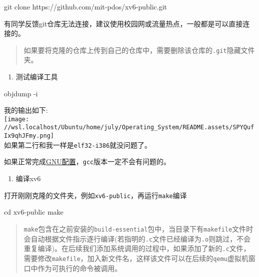 \documentclass[
]{article}
\newenvironment{Shaded}{}{}
\newcommand{\AttributeTok}[1]{\textcolor[rgb]{0.49,0.56,0.16}{#1}}
\newcommand{\BuiltInTok}[1]{\textcolor[rgb]{0.00,0.50,0.00}{#1}}
\newcommand{\ExtensionTok}[1]{#1}
\newcommand{\FunctionTok}[1]{\textcolor[rgb]{0.02,0.16,0.49}{#1}}
\newcommand{\NormalTok}[1]{#1}
\begin{document}
\begin{Shaded}
  \begin{Highlighting}[]
    \FunctionTok{git}\NormalTok{ clone https://github.com/mit{-}pdos/xv6{-}public.git}
  \end{Highlighting}
\end{Shaded}

有同学反馈git仓库无法连接，建议使用校园网或流量热点，一般都是可以直接连接的。

\begin{quote}
  如果要将克隆的仓库上传到自己的仓库中，需要删除该仓库的\texttt{.git}隐藏文件夹。
\end{quote}

\begin{enumerate}[resume]
  \def\labelenumi{\arabic{enumi}.}
  \item
        测试编译工具
\end{enumerate}

\begin{Shaded}
  \begin{Highlighting}[]
    \ExtensionTok{objdump} \AttributeTok{{-}i}
  \end{Highlighting}
\end{Shaded}

我的输出如下:\\
\texttt{[image: //wsl.localhost/Ubuntu/home/july/Operating\_System/README.assets/SPYQufIx9qhJFmy.png]}\\
如果第二行和我一样是\texttt{elf32-i386}就没问题了。

如果正常完成\hyperref[GNU]{GNU配置}，\texttt{gcc}版本一定不会有问题的。

\begin{enumerate}[resume]
  \def\labelenumi{\arabic{enumi}.}
  \item
        编译xv6
\end{enumerate}

打开刚刚克隆的文件夹，例如\texttt{xv6-public}，再运行\texttt{make}编译

\begin{Shaded}
  \begin{Highlighting}[]
    \BuiltInTok{cd}\NormalTok{ xv6{-}public}
    \FunctionTok{make}
  \end{Highlighting}
\end{Shaded}

\begin{quote}
  \texttt{make}包含在之前安装的\texttt{build-essential}包中，当目录下有\texttt{makefile}文件时会自动根据文件指示逐行编译(若指明的\texttt{.c}文件已经编译为\texttt{.o}则跳过，不会重复编译)。在后续我们添加系统调用的过程中，如果添加了新的\texttt{.c}文件，需要修改\texttt{makefile}，加入新文件名，这样该文件可以在后续的\texttt{qemu}虚拟机窗口中作为可执行的命令被调用。
\end{quote}
\end{document}
